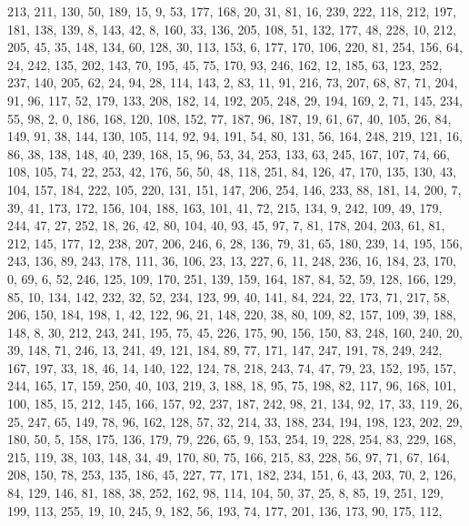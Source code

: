 \begin{DoxyCode}
       213, 211, 130, 50, 189, 15, 9, 53, 177, 168, 20, 31, 81, 16, 239, 222, 118, 212, 197, 181, 138, 139, 8, 143,
       42, 8, 160, 33, 136, 205, 108, 51, 132, 177, 48, 228, 10, 212, 205, 45, 35, 148, 134, 60, 128, 30, 113, 153,
       6, 177, 170, 106, 220, 81, 254, 156, 64, 24, 242, 135, 202, 143, 70, 195, 45, 75, 170, 93, 246, 162, 12,
       185, 63, 123, 252, 237, 140, 205, 62, 24, 94, 28, 114, 143, 2, 83, 11, 91, 216, 73, 207, 68, 87, 71, 204, 91,
       96, 117, 52, 179, 133, 208, 182, 14, 192, 205, 248, 29, 194, 169, 2, 71, 145, 234, 55, 98, 2, 0, 186, 168,
       120, 108, 152, 77, 187, 96, 187, 19, 61, 67, 40, 105, 26, 84, 149, 91, 38, 144, 130, 105, 114, 92, 94, 191,
       54, 80, 131, 56, 164, 248, 219, 121, 16, 86, 38, 138, 148, 40, 239, 168, 15, 96, 53, 34, 253, 133, 63, 245,
       167, 107, 74, 66, 108, 105, 74, 22, 253, 42, 176, 56, 50, 48, 118, 251, 84, 126, 47, 170, 135, 130, 43, 104,
       157, 184, 222, 105, 220, 131, 151, 147, 206, 254, 146, 233, 88, 181, 14, 200, 7, 39, 41, 173, 172, 156, 104,
       188, 163, 101, 41, 72, 215, 134, 9, 242, 109, 49, 179, 244, 47, 27, 252, 18, 26, 42, 80, 104, 40, 93, 45,
       97, 7, 81, 178, 204, 203, 61, 81, 212, 145, 177, 12, 238, 207, 206, 246, 6, 28, 136, 79, 31, 65, 180, 239, 14,
       195, 156, 243, 136, 89, 243, 178, 111, 36, 106, 23, 13, 227, 6, 11, 248, 236, 16, 184, 23, 170, 0, 69, 6,
       52, 246, 125, 109, 170, 251, 139, 159, 164, 187, 84, 52, 59, 128, 166, 129, 85, 10, 134, 142, 232, 32, 52,
       234, 123, 99, 40, 141, 84, 224, 22, 173, 71, 217, 58, 206, 150, 184, 198, 1, 42, 122, 96, 21, 148, 220, 38,
       80, 109, 82, 157, 109, 39, 188, 148, 8, 30, 212, 243, 241, 195, 75, 45, 226, 175, 90, 156, 150, 83, 248, 160,
       240, 20, 39, 148, 71, 246, 13, 241, 49, 121, 184, 89, 77, 171, 147, 247, 191, 78, 249, 242, 167, 197, 33,
       18, 46, 14, 140, 122, 124, 78, 218, 243, 74, 47, 79, 23, 152, 195, 157, 244, 165, 17, 159, 250, 40, 103, 219,
       3, 188, 18, 95, 75, 198, 82, 117, 96, 168, 101, 100, 185, 15, 212, 145, 166, 157, 92, 237, 187, 242, 98, 21,
       134, 92, 17, 33, 119, 26, 25, 247, 65, 149, 78, 96, 162, 128, 57, 32, 214, 33, 188, 234, 194, 198, 123,
       202, 29, 180, 50, 5, 158, 175, 136, 179, 79, 226, 65, 9, 153, 254, 19, 228, 254, 83, 229, 168, 215, 119, 38,
       103, 148, 34, 49, 170, 80, 75, 166, 215, 83, 228, 56, 97, 71, 67, 164, 208, 150, 78, 253, 135, 186, 45, 227,
       77, 171, 182, 234, 151, 6, 43, 203, 70, 2, 126, 84, 129, 146, 81, 188, 38, 252, 162, 98, 114, 104, 50, 37,
       25, 8, 85, 19, 251, 129, 199, 113, 255, 19, 10, 245, 9, 182, 56, 193, 74, 177, 201, 136, 173, 90, 175, 112,

\end{DoxyCode}
